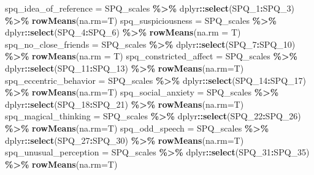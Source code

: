 \documentclass[
]{article}
\newenvironment{Shaded}{\begin{snugshade}}{\end{snugshade}}
\newcommand{\AttributeTok}[1]{\textcolor[rgb]{0.13,0.29,0.53}{#1}}
\newcommand{\FunctionTok}[1]{\textcolor[rgb]{0.13,0.29,0.53}{\textbf{#1}}}
\newcommand{\NormalTok}[1]{#1}
\newcommand{\OtherTok}[1]{\textcolor[rgb]{0.56,0.35,0.01}{#1}}
\newcommand{\SpecialCharTok}[1]{\textcolor[rgb]{0.81,0.36,0.00}{\textbf{#1}}}
\begin{document}
\begin{Shaded}
\begin{Highlighting}[]
\NormalTok{spq\_idea\_of\_reference }\OtherTok{=}\NormalTok{ SPQ\_scales }\SpecialCharTok{\%\textgreater{}\%}\NormalTok{ dplyr}\SpecialCharTok{::}\FunctionTok{select}\NormalTok{(SPQ\_1}\SpecialCharTok{:}\NormalTok{SPQ\_3) }\SpecialCharTok{\%\textgreater{}\%} \FunctionTok{rowMeans}\NormalTok{(}\AttributeTok{na.rm=}\NormalTok{T)}
\NormalTok{spq\_suspiciousness }\OtherTok{=}\NormalTok{ SPQ\_scales }\SpecialCharTok{\%\textgreater{}\%}\NormalTok{ dplyr}\SpecialCharTok{::}\FunctionTok{select}\NormalTok{(SPQ\_4}\SpecialCharTok{:}\NormalTok{SPQ\_6) }\SpecialCharTok{\%\textgreater{}\%} \FunctionTok{rowMeans}\NormalTok{(}\AttributeTok{na.rm =}\NormalTok{ T)}
\NormalTok{spq\_no\_close\_friends }\OtherTok{=}\NormalTok{ SPQ\_scales }\SpecialCharTok{\%\textgreater{}\%}\NormalTok{ dplyr}\SpecialCharTok{::}\FunctionTok{select}\NormalTok{(SPQ\_7}\SpecialCharTok{:}\NormalTok{SPQ\_10) }\SpecialCharTok{\%\textgreater{}\%} \FunctionTok{rowMeans}\NormalTok{(}\AttributeTok{na.rm =}\NormalTok{ T)}
\NormalTok{spq\_constricted\_affect }\OtherTok{=}\NormalTok{ SPQ\_scales }\SpecialCharTok{\%\textgreater{}\%}\NormalTok{ dplyr}\SpecialCharTok{::}\FunctionTok{select}\NormalTok{(SPQ\_11}\SpecialCharTok{:}\NormalTok{SPQ\_13) }\SpecialCharTok{\%\textgreater{}\%} \FunctionTok{rowMeans}\NormalTok{(}\AttributeTok{na.rm=}\NormalTok{T)}
\NormalTok{spq\_eccentric\_behavior }\OtherTok{=}\NormalTok{ SPQ\_scales }\SpecialCharTok{\%\textgreater{}\%}\NormalTok{ dplyr}\SpecialCharTok{::}\FunctionTok{select}\NormalTok{(SPQ\_14}\SpecialCharTok{:}\NormalTok{SPQ\_17) }\SpecialCharTok{\%\textgreater{}\%} \FunctionTok{rowMeans}\NormalTok{(}\AttributeTok{na.rm=}\NormalTok{T)}
\NormalTok{spq\_social\_anxiety }\OtherTok{=}\NormalTok{ SPQ\_scales }\SpecialCharTok{\%\textgreater{}\%}\NormalTok{ dplyr}\SpecialCharTok{::}\FunctionTok{select}\NormalTok{(SPQ\_18}\SpecialCharTok{:}\NormalTok{SPQ\_21) }\SpecialCharTok{\%\textgreater{}\%} \FunctionTok{rowMeans}\NormalTok{(}\AttributeTok{na.rm=}\NormalTok{T)}
\NormalTok{spq\_magical\_thinking }\OtherTok{=}\NormalTok{ SPQ\_scales }\SpecialCharTok{\%\textgreater{}\%}\NormalTok{ dplyr}\SpecialCharTok{::}\FunctionTok{select}\NormalTok{(SPQ\_22}\SpecialCharTok{:}\NormalTok{SPQ\_26) }\SpecialCharTok{\%\textgreater{}\%} \FunctionTok{rowMeans}\NormalTok{(}\AttributeTok{na.rm=}\NormalTok{T)}
\NormalTok{spq\_odd\_speech }\OtherTok{=}\NormalTok{ SPQ\_scales }\SpecialCharTok{\%\textgreater{}\%}\NormalTok{ dplyr}\SpecialCharTok{::}\FunctionTok{select}\NormalTok{(SPQ\_27}\SpecialCharTok{:}\NormalTok{SPQ\_30) }\SpecialCharTok{\%\textgreater{}\%} \FunctionTok{rowMeans}\NormalTok{(}\AttributeTok{na.rm=}\NormalTok{T)}
\NormalTok{spq\_unusual\_perception }\OtherTok{=}\NormalTok{ SPQ\_scales }\SpecialCharTok{\%\textgreater{}\%}\NormalTok{ dplyr}\SpecialCharTok{::}\FunctionTok{select}\NormalTok{(SPQ\_31}\SpecialCharTok{:}\NormalTok{SPQ\_35) }\SpecialCharTok{\%\textgreater{}\%} \FunctionTok{rowMeans}\NormalTok{(}\AttributeTok{na.rm=}\NormalTok{T)}


\end{Highlighting}
\end{Shaded}
\end{document}
